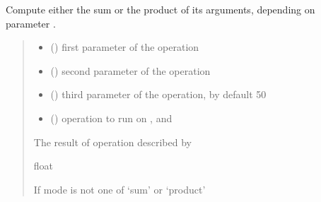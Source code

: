 \documentclass[letterpaper,10pt,english]{sphinxmanual}
\begin{document}
\begin{fulllineitems}
\label{\detokenize{source/src.subpackage_2.subpackage_2_A:src.subpackage_2.subpackage_2_A.module_2_A_1.documented_function}}
\pysigstartsignatures
{}
\pysigstopsignatures
\sphinxAtStartPar
Compute either the sum or the product of its arguments,
depending on parameter .
\begin{quote}\begin{description}
\begin{itemize}
\item {} 
\sphinxAtStartPar
{} () \textendash{} first parameter of the operation

\item {} 
\sphinxAtStartPar
{} () \textendash{} second parameter of the operation

\item {} 
\sphinxAtStartPar
{} (\sphinxstyleliteralemphasis{\sphinxupquote{, }}) \textendash{} third parameter of the operation, by default 50

\item {} 
\sphinxAtStartPar
{} (\sphinxstyleliteralemphasis{\sphinxupquote{, }}) \textendash{} operation to run on ,  and 

\end{itemize}

\sphinxAtStartPar
The result of operation described by 

\sphinxAtStartPar
float

\sphinxAtStartPar
{} \textendash{} If mode is not one of ‘sum’ or ‘product’

\end{description}\end{quote}

\end{fulllineitems}
\end{document}

